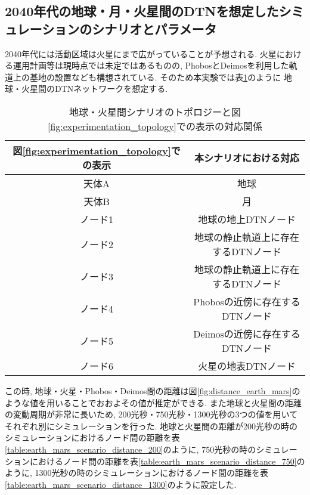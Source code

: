 \subsection{2040年代の地球・月・火星間のDTNを想定したシミュレーションのシナリオとパラメータ}
\label{section:2040年代の地球・月・火星間のDTNを想定したシミュレーションのシナリオとパラメータ}
2040年代には活動区域は火星にまで広がっていることが予想される. 
火星における運用計画等は現時点では未定ではあるものの, 
PhobosとDeimosを利用した軌道上の基地の設置なども構想されている.
そのため本実験では表\ref{table:earth_mars_scenario_topology}のように
地球・火星間のDTNネットワークを想定する. 

\begin{table}[htbp]
    \centering
    \caption{地球・火星間シナリオのトポロジーと図\ref{fig:experimentation_topology}での表示の対応関係}
    \begin{tabular}{cc}  \hline
        図\ref{fig:experimentation_topology}での表示 & 本シナリオにおける対応 \\ \hline
        天体A & 地球 \\
        天体B & 月 \\
        ノード1 & 地球の地上DTNノード \\
        ノード2 & 地球の静止軌道上に存在するDTNノード \\
        ノード3 & 地球の静止軌道上に存在するDTNノード \\
        ノード4 & Phobosの近傍に存在するDTNノード \\
        ノード5 & Deimosの近傍に存在するDTNノード \\
        ノード6 & 火星の地表DTNノード \\ \hline
    \end{tabular}
    \label{table:earth_mars_scenario_topology}
\end{table}

この時, 地球・火星・Phobos・Deimos間の距離は図\ref{fig:distance_earth_mars}のような値を用いることでおおよその値が推定ができる. 
また地球と火星間の距離の変動周期が非常に長いため, 200光秒・750光秒・1300光秒の3つの値を用いてそれぞれ別にシミュレーションを行った.
地球と火星間の距離が200光秒の時のシミュレーションにおけるノード間の距離を表\ref{table:earth_mars_scenario_distance_200}のように, 
750光秒の時のシミュレーションにおけるノード間の距離を表\ref{table:earth_mars_scenario_distance_750}のように, 
1300光秒の時のシミュレーションにおけるノード間の距離を表\ref{table:earth_mars_scenario_distance_1300}のように設定した.



